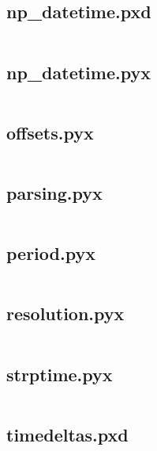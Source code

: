 \documentclass{article}
\begin{document}
\subsection{np\_datetime.pxd}
\inputminted{cython}{/home/dufferzafar/dev/@clones/pandas/pandas/_libs/tslibs/np_datetime.pxd}
\newpage

\subsection{np\_datetime.pyx}
\inputminted{cython}{/home/dufferzafar/dev/@clones/pandas/pandas/_libs/tslibs/np_datetime.pyx}
\newpage

\subsection{offsets.pyx}
\inputminted{cython}{/home/dufferzafar/dev/@clones/pandas/pandas/_libs/tslibs/offsets.pyx}
\newpage

\subsection{parsing.pyx}
\inputminted{cython}{/home/dufferzafar/dev/@clones/pandas/pandas/_libs/tslibs/parsing.pyx}
\newpage

\subsection{period.pyx}
\inputminted{cython}{/home/dufferzafar/dev/@clones/pandas/pandas/_libs/tslibs/period.pyx}
\newpage

\subsection{resolution.pyx}
\inputminted{cython}{/home/dufferzafar/dev/@clones/pandas/pandas/_libs/tslibs/resolution.pyx}
\newpage

\subsection{strptime.pyx}
\inputminted{cython}{/home/dufferzafar/dev/@clones/pandas/pandas/_libs/tslibs/strptime.pyx}
\newpage

\subsection{timedeltas.pxd}
\inputminted{cython}{/home/dufferzafar/dev/@clones/pandas/pandas/_libs/tslibs/timedeltas.pxd}
\newpage
\end{document}
